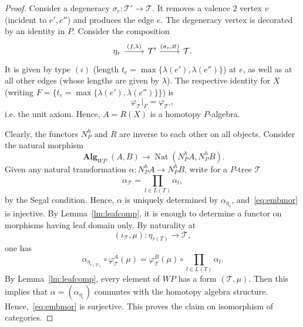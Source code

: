 \documentclass{amsart}
\theoremstyle{definition}
\theoremstyle{remark}
\newcommand{\lb}{\lbrace}
\newcommand{\rb}{\rbrace}
\DeclareMathOperator{\Alg}{\mathbf{Alg}}
\DeclareMathOperator{\Nat}{Nat}
\renewcommand{\phi}{\varphi}
\begin{document}
\begin{proof}
		Consider a degeneracy $\sigma_{e}\colon \mathcal{T}'\to \mathcal{T}$. 
		It removes a valence $2$ vertex $v$ (incident to $e',e''$) and produces the edge $e$.
		The degeneracy vertex is decorated by an identity in $P$. 
		Consider the composition
		\[
		\begin{tikzcd}
			\eta_{r}\arrow{r}{(f,\lambda)} &
			\mathcal{T}'\arrow{r}{(\sigma_{e},\varnothing)} &
			\mathcal{T}.
		\end{tikzcd}		
		\]
		It is given by type $(i)$ (length $t_{e}=\max\lb\lambda(e'),\lambda(e'')\rb$) at $e$, as well as at all other edges (whose lengths are given by $\lambda$).
		The respective identity for $X$ (writing $F=\lb t_{e}=\max\lb\lambda(e'),\lambda(e'')\rb\rb$) is
		\[
			\phi_{\mathcal{T}}|_{F}=
			\phi_{\mathcal{T}'},
		\]
		i.e. the unit axiom.
		Hence, $A=R(X)$ is a homotopy $P$-algebra.

		Clearly, the functors $N^{h}_{P}$ and $R$ are inverse to each other on all objects.
		Consider the natural morphism
		\begin{equation}\label{eq:embmor}
			\Alg_{WP}(A,B)\to
			\Nat(N^{h}_{P}A,N^{h}_{P}B).
		\end{equation}
		Given any natural transformation $\alpha\colon N^{h}_{P}A\to N^{h}_{P}B$, write for a $P$-tree $\mathcal{T}$
		\[
			\alpha_{\mathcal{T}}=\prod\limits_{l\in L(T)} \alpha_{l},
		\] 
		by the Segal condition.
		Hence, $\alpha$ is uniquely determined by $\alpha_{\eta_{c}}$, and~\eqref{eq:embmor} is injective.
		By Lemma~\ref{lm:leafcomp}, it is enough to determine a functor on morphisms having leaf domain only.
		By naturality at 
		\[
			(\iota_{\mathcal{T}},\mu)\colon \eta_{r(T)}\to \mathcal{T},
		\]
		one has
		\[
			\alpha_{\eta_{r(T)}}\circ
			\phi^{A}_{\mathcal{T}}(\mu)=
			\phi^{B}_{\mathcal{T}}(\mu)\circ
			\prod_{l\in L(T)}\alpha_{l}.
		\]
		By Lemma~\ref{lm:leafcomp}, every element of $WP$ has a form $(\mathcal{T},\mu)$.
		Then this implies that $\alpha=(\alpha_{\eta_{c}})$ commutes with the homotopy algebra structure.
		Hence,~\eqref{eq:embmor} is surjective.
		This proves the claim on isomorphism of categories.
	\end{proof}
	
\end{document}
